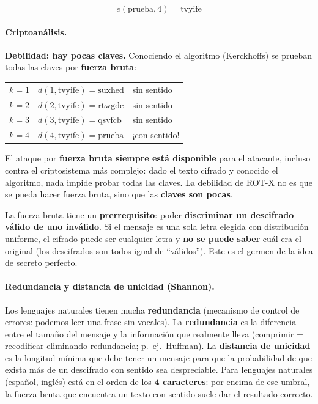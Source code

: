 \documentclass[../main.tex]{subfiles}
\begin{document}
$$e(\text{prueba}, 4) = \text{tvyife}$$

\paragraph{Criptoanálisis.} \textbf{Debilidad: hay pocas claves.} Conociendo el
algoritmo (Kerckhoffs) se prueban todas las claves por \textbf{fuerza bruta}:
\begin{center}
\begin{tabular}{lll}
$k=1$ & $d(1,\text{tvyife})=\text{suxhed}$ & sin sentido \\
$k=2$ & $d(2,\text{tvyife})=\text{rtwgdc}$ & sin sentido \\
$k=3$ & $d(3,\text{tvyife})=\text{qsvfcb}$ & sin sentido \\
$k=4$ & $d(4,\text{tvyife})=\text{prueba}$ & ¡con sentido! \\
\end{tabular}
\end{center}

\begin{destacado}
El ataque por \textbf{fuerza bruta siempre está disponible} para el atacante,
incluso contra el criptosistema más complejo: dado el texto cifrado y conocido
el algoritmo, nada impide probar todas las claves. La debilidad de ROT-X no es
que se pueda hacer fuerza bruta, sino que las \textbf{claves son pocas}.
\end{destacado}

\begin{ojo}
La fuerza bruta tiene un \textbf{prerrequisito}: poder \textbf{discriminar un
descifrado válido de uno inválido}. Si el mensaje es una sola letra elegida con
distribución uniforme, el cifrado puede ser cualquier letra y \textbf{no se
puede saber} cuál era el original (los descifrados son todos igual de
``válidos''). Este es el germen de la idea de secreto perfecto.
\end{ojo}

\paragraph{Redundancia y distancia de unicidad (Shannon).} Los lenguajes
naturales tienen mucha \textbf{redundancia} (mecanismo de control de errores:
podemos leer una frase sin vocales). La \textbf{redundancia} es la diferencia
entre el tamaño del mensaje y la información que realmente lleva (comprimir =
recodificar eliminando redundancia; p.\ ej.\ Huffman). La \textbf{distancia de
unicidad} es la longitud mínima que debe tener un mensaje para que la
probabilidad de que exista más de un descifrado con sentido sea despreciable.
Para lenguajes naturales (español, inglés) está en el orden de los
\textbf{4 caracteres}: por encima de ese umbral, la fuerza bruta que encuentra
un texto con sentido suele dar el resultado correcto.
\end{document}
